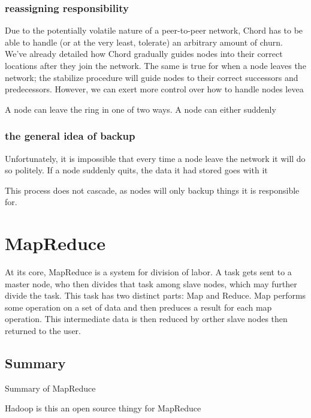 \documentclass[conference, compsocconf, letterpaper]{IEEEtran}
\begin{document}
\subsubsection{reassigning responsibility}
Due to the potentially volatile nature of a peer-to-peer network, Chord has to be able to handle (or at the very least, tolerate) an arbitrary amount of churn.  We've already detailed how Chord gradually guides nodes into their correct locations after they join the network.  The same is true for when a node leaves the network; the stabilize procedure will guide nodes to their correct successors and predecessors.  However, we can exert more control over how to handle nodes levea

A node can leave the ring in one of two ways.  A node can either suddenly

\subsubsection{the general idea of backup}
Unfortunately, it is impossible that every time a node leave the network it will do so politely.  If a node suddenly quits, the data it had stored goes with it

This process does not cascade, as nodes will only backup things it is responsible for.


\subsubsection{}
\section{MapReduce}
At its core, MapReduce \cite{mapreduce} is a system for division of labor.  A task gets sent to a master node, who then divides that task among slave nodes, which may further divide the task.  This task has two distinct parts: Map and Reduce.  Map performs some operation on a set of data and then preduces a result for each map operation.  This intermediate data is then reduced by orther slave nodes then returned to the user. 

\subsection{Summary}

Summary of MapReduce \cite{mapreduce} 

Hadoop is this an open source thingy for MapReduce \cite{hadoop}
\end{document}

